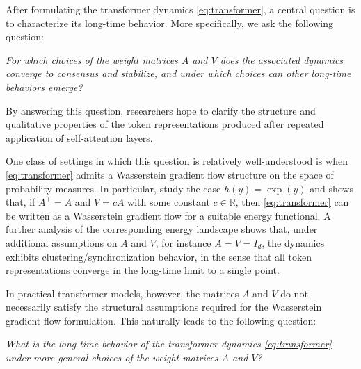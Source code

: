 \documentclass[10pt]{article}
\theoremstyle{definition}
\theoremstyle{definition}
\numberwithin{equation}{section}
\newcommand{\R}{\mathbb{R}}
\begin{document}
After formulating the transformer dynamics \eqref{eq:transformer}, a central question is to characterize its long-time behavior. More specifically, we ask the following question:
\begin{center}
\begin{minipage}{0.95\textwidth}
\centering
\textit{For which choices of the weight matrices $A$ and $V$ does the associated dynamics converge to consensus and stabilize, and under which choices can other long-time behaviors emerge?}
\end{minipage}
\end{center}
By answering this question, researchers hope to clarify the structure and qualitative properties of the token representations produced after repeated application of self-attention layers.

One class of settings in which this question is relatively well-understood is when \eqref{eq:transformer} admits a Wasserstein gradient flow structure on the space of probability measures.
In particular, \cite{geshkovski2023mathematical,burger2025analysis} study the case $h(y) = \exp(y)$ and shows that, if $A^{\top} = A$ and $V = cA$ with some constant $c \in \R$, then \eqref{eq:transformer} can be written as a Wasserstein gradient flow for a suitable energy functional.
A further analysis of the corresponding energy landscape shows that, under additional assumptions on $A$ and $V$, for instance $A = V = I_d$, the dynamics exhibits clustering/synchronization behavior, in the sense that all token representations converge in the long-time limit to a single point. 

In practical transformer models, however, the matrices $A$ and $V$ do not necessarily satisfy the structural assumptions required for the Wasserstein gradient flow formulation.
This naturally leads to the following question:
\begin{center}
\begin{minipage}{0.95\textwidth}
\centering
\textit{What is the long-time behavior of the transformer dynamics \eqref{eq:transformer} under more general choices of the weight matrices $A$ and $V$?}
\end{minipage}
\end{center}
\end{document}

